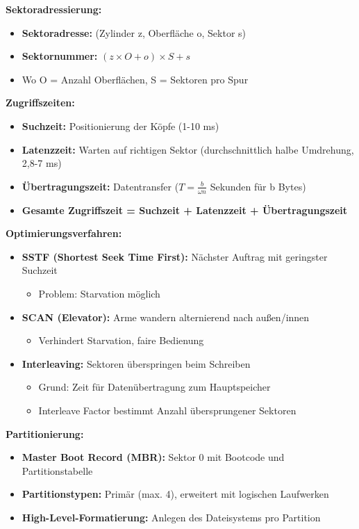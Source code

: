 \documentclass[9pt,a4paper]{extarticle}
\begin{document}
\begin{multicols*}{2}
\textbf{Sektoradressierung:}
\begin{itemize}
\item \textbf{Sektoradresse:} (Zylinder z, Oberfläche o, Sektor s)
\item \textbf{Sektornummer:} $(z \times O + o) \times S + s$
\item Wo O = Anzahl Oberflächen, S = Sektoren pro Spur
\end{itemize}

\textbf{Zugriffszeiten:}
\begin{itemize}
\item \textbf{Suchzeit:} Positionierung der Köpfe (1-10 ms)
\item \textbf{Latenzzeit:} Warten auf richtigen Sektor (durchschnittlich halbe Umdrehung, 2,8-7 ms)
\item \textbf{Übertragungszeit:} Datentransfer ($T = \frac{b}{\omega n}$ Sekunden für b Bytes)
\item \textbf{Gesamte Zugriffszeit = Suchzeit + Latenzzeit + Übertragungszeit}
\end{itemize}

\textbf{Optimierungsverfahren:}
\begin{itemize}
\item \textbf{SSTF (Shortest Seek Time First):} Nächster Auftrag mit geringster Suchzeit
  \begin{itemize}
  \item Problem: Starvation möglich
  \end{itemize}
\item \textbf{SCAN (Elevator):} Arme wandern alternierend nach außen/innen
  \begin{itemize}
  \item Verhindert Starvation, faire Bedienung
  \end{itemize}
\item \textbf{Interleaving:} Sektoren überspringen beim Schreiben
  \begin{itemize}
  \item Grund: Zeit für Datenübertragung zum Hauptspeicher
  \item Interleave Factor bestimmt Anzahl übersprungener Sektoren
  \end{itemize}
\end{itemize}

\textbf{Partitionierung:}
\begin{itemize}
\item \textbf{Master Boot Record (MBR):} Sektor 0 mit Bootcode und Partitionstabelle
\item \textbf{Partitionstypen:} Primär (max. 4), erweitert mit logischen Laufwerken
\item \textbf{High-Level-Formatierung:} Anlegen des Dateisystems pro Partition
\end{itemize}


\end{multicols*}
\end{document}
